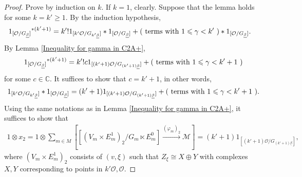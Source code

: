 \documentclass[12pt]{amsart}
\theoremstyle{definition}
\numberwithin{equation}{section}
\begin{document}
\begin{proof}
    Prove by induction on $ k $. 
    If $ k=1 $, clearly. 
    Suppose that the lemma holds for some $ k = k' \geqslant 1 $. 
    By the induction hypothesis,
    \begin{align*}
        {1_{[\mathcal{O}/G_{\underline{\beta}}]}}^{*(k'+1)}  &= k'! 1_{[k'\mathcal{O}/G_{k'\underline{\beta}}]} * 1_{[\mathcal{O}/G_{\underline{\beta}}]} + (\text{ terms with $ 1 \leqslant \gamma < k' $ } ) * 1_{[\mathcal{O}/G_{\underline{\beta}}]}. 
    \end{align*}
    By Lemma \ref{Inequality for gamma in C2A+},
    \begin{align*}
        {1_{[\mathcal{O}/G_{\underline{\beta}}]}}^{*(k'+1)} = k'! c 1_{[(k'+1)\mathcal{O}/G_{(k'+1)\underline{\beta}}]} + (\text{ terms with $  1 \leqslant \gamma <k'+1 $ } )
    \end{align*}
    for some  $ c \in \mathbb{C} $. 
    It suffices to show that $ c=k'+1 $, in other words,
    \begin{align*}
        1_{[k'\mathcal{O}/G_{k'\underline{\beta}}]} * 1_{[\mathcal{O}/G_{\underline{\beta}}]} = (k'+1) 1_{[(k'+1)\mathcal{O}/G_{(k'+1)\underline{\beta}}]} +(\text{ terms with $ 1 \leqslant  \gamma <k'+1 $ }  ). 
    \end{align*}
    Using the same notations as in Lemma \ref{Inequality for gamma in C2A+}, it suffices to show that
    \begin{align*}
        1 \otimes x_2 = 1 \otimes \sum_{m \in M} [[(V_m \times E_m^1)_2/G_m \ltimes E_m^0] \xrightarrow{(\varphi_m)_2} \mathcal{M}] = (k'+1) 1_{[(k'+1)\mathcal{O}/G_{(k'+1)\underline{\beta}}]},
    \end{align*}
    where $ (V_m \times E_m^1)_2 $ consists of $ (v,\xi) $ such that $ Z_{\xi} \cong X  \oplus Y $ with complexes $ X,Y $ corresponding to points in $ k'\mathcal{O},\mathcal{O} $. 


\end{proof}
\end{document}
